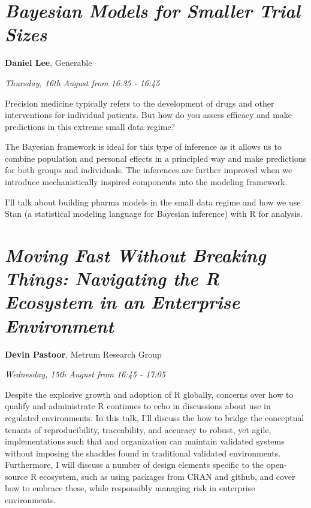 \documentclass[]{book}
\theoremstyle{definition}
\theoremstyle{definition}
\theoremstyle{definition}
\theoremstyle{remark}
\begin{document}
\hypertarget{bayesian-models-for-smaller-trial-sizes}{%
\section{\texorpdfstring{\emph{Bayesian Models for Smaller Trial
Sizes}}{Bayesian Models for Smaller Trial Sizes}}\label{bayesian-models-for-smaller-trial-sizes}}

\textbf{Daniel Lee}, Generable

\emph{Thursday, 16th August from 16:35 - 16:45}

Precision medicine typically refers to the development of drugs and
other interventions for individual patients. But how do you assess
efficacy and make predictions in this extreme small data regime?

The Bayesian framework is ideal for this type of inference as it allows
us to combine population and personal effects in a principled way and
make predictions for both groups and individuals. The inferences are
further improved when we introduce mechanistically inspired components
into the modeling framework.

I'll talk about building pharma models in the small data regime and how
we use Stan (a statistical modeling language for Bayesian inference)
with R for analysis.

\hypertarget{moving-fast-without-breaking-things-navigating-the-r-ecosystem-in-an-enterprise-environment}{%
\section{\texorpdfstring{\emph{Moving Fast Without Breaking Things:
Navigating the R Ecosystem in an Enterprise
Environment}}{Moving Fast Without Breaking Things: Navigating the R Ecosystem in an Enterprise Environment}}\label{moving-fast-without-breaking-things-navigating-the-r-ecosystem-in-an-enterprise-environment}}

\textbf{Devin Pastoor}, Metrum Research Group

\emph{Wednesday, 15th August from 16:45 - 17:05}

Despite the explosive growth and adoption of R globally, concerns over
how to qualify and administrate R continues to echo in discussions about
use in regulated environments. In this talk, I'll discuss the how to
bridge the conceptual tenants of reproducibility, traceability, and
accuracy to robust, yet agile, implementations such that and
organization can maintain validated systems without imposing the
shackles found in traditional validated environments. Furthermore, I
will discuss a number of design elements specific to the open-source R
ecosystem, such as using packages from CRAN and github, and cover how to
embrace these, while responsibly managing risk in enterprise
environments.
\end{document}
